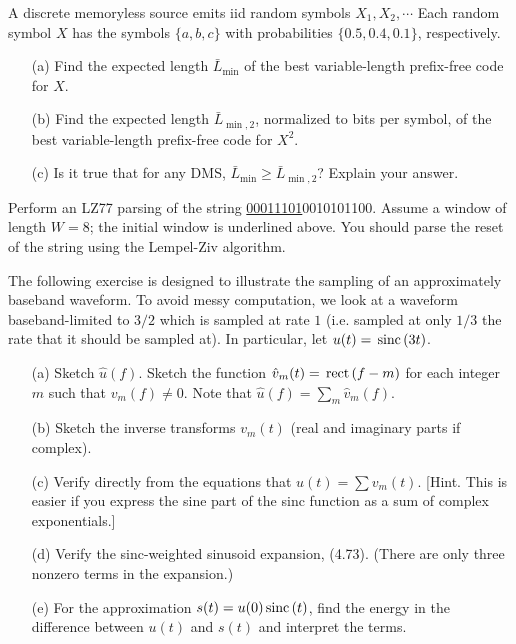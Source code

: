 \documentclass{assignment}
\begin{document}
\begin{prob}[2.21]
    A discrete memoryless source emits iid random symbols $X_1,X_2,\cdots$ Each random symbol $X$ has the symbols $\{a,b,c\}$ with probabilities $\{0.5,0.4,0.1\}$, respectively.
    \begin{itemize}
        \item[(a)] Find the expected length $\bar{L}_{\min}$ of the best variable-length prefix-free code for $X$.
        \item[(b)] Find the expected length $\bar{L}_{\min,2}$, normalized to bits per symbol, of the best variable-length prefix-free code for $X^2$.
        \item[(c)] Is it true that for any DMS, $\bar{L}_{\min}\geq\bar{L}_{\min,2}$? Explain your answer.
    \end{itemize}
\end{prob}
\begin{sol}
\end{sol}

\begin{prob}[2.33]
    Perform an LZ77 parsing of the string \uline{00011101}0010101100. Assume a window of length $W=8$; the initial window is underlined above. You should parse the reset of the string using the Lempel-Ziv algorithm.
\end{prob}
\begin{sol}
\end{sol}

\begin{prob}[4.35 Aliasing]
    The following exercise is designed to illustrate the sampling of an approximately baseband waveform. To avoid messy computation, we look at a waveform baseband-limited to $3/2$ which is sampled at rate $1$ (i.e. sampled at only $1/3$ the rate that it should be sampled at). In particular, let $u(t)=\,\text{sinc}\,(3t)$.
    \begin{itemize}
        \item[(a)] Sketch $\hat{u}(f)$. Sketch the function $\hat{v}_m(t)=\,\text{rect}\,(f-m)$ for each integer $m$ such that $v_m(f)\neq 0$. Note that $\hat{u}(f)=\sum_m\hat{v}_m(f)$.
        \item[(b)] Sketch the inverse transforms $v_m(t)$ (real and imaginary parts if complex).
        \item[(c)] Verify directly from the equations that $u(t)=\sum v_m(t)$. [Hint. This is easier if you express the sine part of the sinc function as a sum of complex exponentials.]
        \item[(d)] Verify the sinc-weighted sinusoid expansion, (4.73). (There are only three nonzero terms in the expansion.)
        \item[(e)] For the approximation $s(t)=u(0)\,\text{sinc}\,(t)$, find the energy in the difference between $u(t)$ and $s(t)$ and interpret the terms.
    \end{itemize}
\end{prob}
\begin{sol}
\end{sol}
\end{document}
